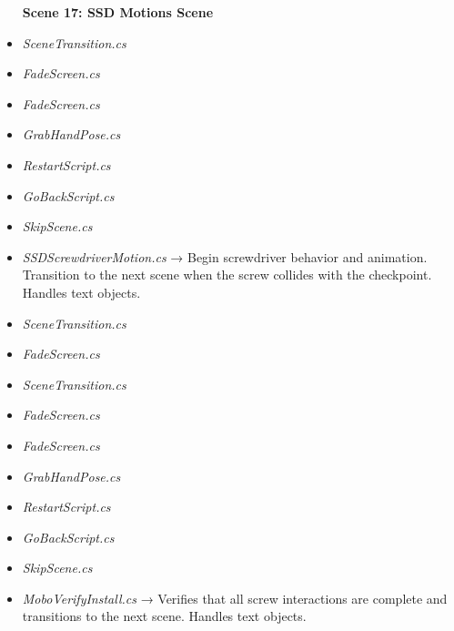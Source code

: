 \documentclass[10pt,twocolumn]{article}
\begin{document}
\begin{itemize}
    \textbf{Scene 17:  SSD Motions Scene}\\
    \item \textit{SceneTransition.cs}\\
    \item \textit{FadeScreen.cs}
\end{itemize}

\begin{itemize}
    \textbf{Scene 18:  SSD Install Scene}\\
    \item \textit{FadeScreen.cs}\\
    \item \textit{GrabHandPose.cs}\\
    \item \textit{RestartScript.cs}\\
    \item \textit{GoBackScript.cs}\\
    \item \textit{SkipScene.cs}\\
    \item \textit{SSDScrewdriverMotion.cs} → Begin screwdriver behavior and animation. Transition to the next scene when the screw collides with the checkpoint. Handles text objects. 
\end{itemize}

\begin{itemize}
    \textbf{Scene 19: Motherboard Informational Scene}\\
    \item \textit{SceneTransition.cs}\\
    \item \textit{FadeScreen.cs}
\end{itemize}

\begin{itemize}
    \textbf{Scene 20: Motherboard Motions Scene 
SceneTransition.cs}\\
    \item \textit{SceneTransition.cs}\\
    \item \textit{FadeScreen.cs}
\end{itemize}

\begin{itemize}
    \textbf{Scene 21: Motherboard Install Scene}\\
    \item \textit{FadeScreen.cs}\\
    \item \textit{GrabHandPose.cs}\\
    \item \textit{RestartScript.cs}\\
    \item \textit{GoBackScript.cs}\\
    \item \textit{SkipScene.cs}\\
    \item \textit{MoboVerifyInstall.cs} → Verifies that all screw interactions are complete and transitions to the next scene. Handles text objects.
\end{itemize}
\end{document}
